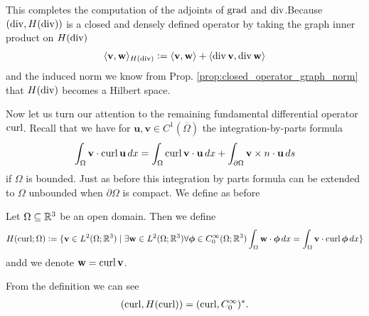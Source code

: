 \documentclass[../main.tex]{subfiles}
\begin{document}


This completes the computation of the adjoints of $\operatorname{grad}$ and $\operatorname{div}$.Because  
$(\operatorname{div}, H(\operatorname{div}))$ is a closed and densely defined operator 
by taking the graph inner product on $H(\operatorname{div})$
\begin{align*}
    \langle \mathbf{v}, \mathbf{w} \rangle _{H(\operatorname{div})}
    \vcentcolon= \langle \mathbf{v}, \mathbf{w} \rangle + \langle \operatorname{div} \mathbf{v}, \operatorname{div} \mathbf{w} \rangle
\end{align*}
and the induced norm
we know from Prop. \ref{prop:closed_operator_graph_norm} that $H(\operatorname{div})$ becomes a Hilbert space.

Now let us turn our attention to the remaining fundamental differential operator 
$\operatorname{curl}$. Recall that we have for 
$\mathbf{u}, \mathbf{v} \in C^1(\overline{\Omega})$ the integration-by-parts 
formula
\begin{align}
    \int_\Omega \mathbf{v} \cdot \operatorname{curl} \mathbf{u} \, dx 
    = \int_\Omega \operatorname{curl} \mathbf{v} \cdot \mathbf{u} \, dx 
        + \int_{\partial \Omega} \mathbf{v} \times n \cdot \mathbf{u} \, ds 
        \label{eq:integration_by_parts_curl_C1} 
\end{align}
if $\Omega$ is bounded. Just as before this integration by parts formula can 
be extended to $\Omega$ unbounded when $\partial \Omega$ is compact. 
We define as before 
\begin{definition}
    Let $\Omega \subseteq \mathbb{R}^3$ be an open domain. 
    Then we define 
    \begin{align*}
        H(\operatorname{curl};\Omega) \vcentcolon= \{ \mathbf{v} \in L^2(\Omega;\mathbb{R}^3)
        \mid \exists \mathbf{w} \in L^2(\Omega; \mathbb{R}^3) 
        \forall \boldsymbol{\phi} \in C_0^\infty(\Omega;\mathbb{R}^3)
        \int_\Omega \mathbf{w} \cdot \boldsymbol{\phi} \, dx 
        = \int_\Omega \mathbf{v} \cdot \operatorname{curl} \boldsymbol{\phi} \, dx \}
    \end{align*}
    andd we denote $\mathbf{w} = \operatorname{curl} \mathbf{v}$.
\end{definition}
From the definition we can see
\begin{align*}
    (\operatorname{curl}, H(\operatorname{curl})) = (\operatorname{curl}, C_0^\infty)^*.
\end{align*}
\end{document}

